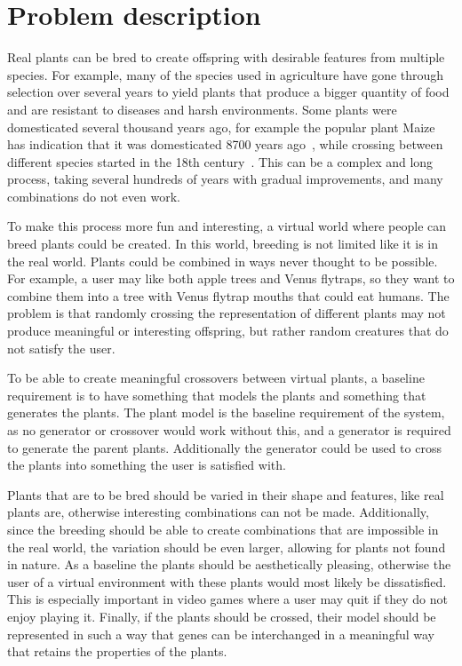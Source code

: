 \section{Problem description}
Real plants can be bred to create offspring with desirable features from multiple species.
For example, many of the species used in agriculture have gone through selection over several years to yield plants that produce a bigger quantity of food and are resistant to diseases and harsh environments.
Some plants were domesticated several thousand years ago, for example the popular plant Maize has indication that it was domesticated 8700 years ago~\cite{2009Starch}, while crossing between different species started in the 18th century~\cite{PlantBreeding}.
This can be a complex and long process, taking several hundreds of years with gradual improvements, and many combinations do not even work.~\cite{2014Hartung, PlantBreeding}

To make this process more fun and interesting, a virtual world where people can breed plants could be created.
In this world, breeding is not limited like it is in the real world.
Plants could be combined in ways never thought to be possible.
For example, a user may like both apple trees and Venus flytraps, so they want to combine them into a tree with Venus flytrap mouths that could eat humans.
The problem is that randomly crossing the representation of different plants may not produce meaningful or interesting offspring, but rather random creatures that do not satisfy the user.

To be able to create meaningful crossovers between virtual plants, a baseline requirement is to have something that models the plants and something that generates the plants.
The plant model is the baseline requirement of the system, as no generator or crossover would work without this, and a generator is required to generate the parent plants.
Additionally the generator could be used to cross the plants into something the user is satisfied with.

Plants that are to be bred should be varied in their shape and features, like real plants are, otherwise interesting combinations can not be made.
Additionally, since the breeding should be able to create combinations that are impossible in the real world, the variation should be even larger, allowing for plants not found in nature.
As a baseline the plants should be aesthetically pleasing, otherwise the user of a virtual environment with these plants would most likely be dissatisfied.
This is especially important in video games where a user may quit if they do not enjoy playing it.
Finally, if the plants should be crossed, their model should be represented in such a way that genes can be interchanged in a meaningful way that retains the properties of the plants.

